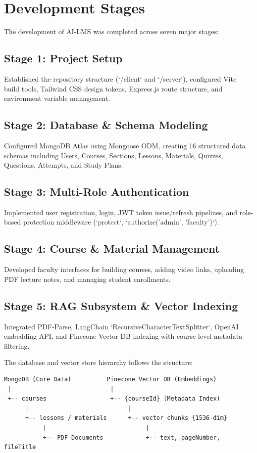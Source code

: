 \section{Development Stages}

The development of AI-LMS was completed across seven major stages:

\subsection{Stage 1: Project Setup}
Established the repository structure (`/client` and `/server`), configured Vite build tools, Tailwind CSS design tokens, Express.js route structure, and environment variable management.

\subsection{Stage 2: Database \& Schema Modeling}
Configured MongoDB Atlas using Mongoose ODM, creating 16 structured data schemas including Users, Courses, Sections, Lessons, Materials, Quizzes, Questions, Attempts, and Study Plans.

\subsection{Stage 3: Multi-Role Authentication}
Implemented user registration, login, JWT token issue/refresh pipelines, and role-based protection middleware (`protect`, `authorize('admin', 'faculty')`).

\subsection{Stage 4: Course \& Material Management}
Developed faculty interfaces for building courses, adding video links, uploading PDF lecture notes, and managing student enrollments.

\subsection{Stage 5: RAG Subsystem \& Vector Indexing}
Integrated PDF-Parse, LangChain `RecursiveCharacterTextSplitter`, OpenAI embedding API, and Pinecone Vector DB indexing with course-level metadata filtering.

The database and vector store hierarchy follows the structure:

\begin{verbatim}
MongoDB (Core Data)          Pinecone Vector DB (Embeddings)
 |                            |
 +-- courses                  +-- {courseId} (Metadata Index)
      |                            |
      +-- lessons / materials      +-- vector_chunks {1536-dim}
           |                            |
           +-- PDF Documents            +-- text, pageNumber, fileTitle
\end{verbatim}

